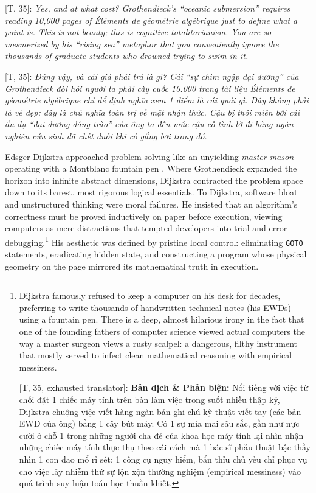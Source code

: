 \documentclass[11pt]{article}
\begin{document}
\vspace{2mm}
\textsf{[T, 35]:} \textit{Yes, and at what cost? Grothendieck's ``oceanic submersion'' requires reading 10,000 pages of Éléments de géométrie algébrique just to define what a point is. This is not beauty; this is cognitive totalitarianism. You are so mesmerized by his ``rising sea'' metaphor that you conveniently ignore the thousands of graduate students who drowned trying to swim in it.}

\textsf{[T, 35]:} \textit{Đúng vậy, và cái giá phải trả là gì? Cái ``sự chìm ngập đại dương'' của Grothendieck đòi hỏi người ta phải cày cuốc 10.000 trang tài liệu Éléments de géométrie algébrique chỉ để định nghĩa xem 1 điểm là cái quái gì. Đây không phải là vẻ đẹp; đây là chủ nghĩa toàn trị về mặt nhận thức. Cậu bị thôi miên bởi cái ẩn dụ ``đại dương dâng trào'' của ông ta đến mức cậu cố tình lờ đi hàng ngàn nghiên cứu sinh đã chết đuối khi cố gắng bơi trong đó.}
\vspace{2mm}

Edsger Dijkstra approached problem-solving like an unyielding \emph{master mason} operating with a Montblanc fountain pen \cite{dijkstra1976discipline}. Where Grothendieck expanded the horizon into infinite abstract dimensions, Dijkstra contracted the problem space down to its barest, most rigorous logical essentials. To Dijkstra, software bloat and unstructured thinking were moral failures. He insisted that an algorithm's correctness must be proved inductively on paper before execution, viewing computers as mere distractions that tempted developers into trial-and-error debugging.\footnote{Dijkstra famously refused to keep a computer on his desk for decades, preferring to write thousands of handwritten technical notes (his EWDs) using a fountain pen. There is a deep, almost hilarious irony in the fact that one of the founding fathers of computer science viewed actual computers the way a master surgeon views a rusty scalpel: a dangerous, filthy instrument that mostly served to infect clean mathematical reasoning with empirical messiness.
	
	\textsf{[T, 35, exhausted translator]:} \textbf{Bản dịch \& Phản biện:} Nổi tiếng với việc từ chối đặt 1 chiếc máy tính trên bàn làm việc trong suốt nhiều thập kỷ, Dijkstra chuộng việc viết hàng ngàn bản ghi chú kỹ thuật viết tay (các bản EWD của ông) bằng 1 cây bút máy. Có 1 sự mỉa mai sâu sắc, gần như nực cười ở chỗ 1 trong những người cha đẻ của khoa học máy tính lại nhìn nhận những chiếc máy tính thực thụ theo cái cách mà 1 bác sĩ phẫu thuật bậc thầy nhìn 1 con dao mổ rỉ sét: 1 công cụ nguy hiểm, bẩn thỉu chủ yếu chỉ phục vụ cho việc lây nhiễm thứ sự lộn xộn thường nghiệm (empirical messiness) vào quá trình suy luận toán học thuần khiết.} His aesthetic was defined by pristine local control: eliminating \texttt{GOTO} statements, eradicating hidden state, and constructing a program whose physical geometry on the page mirrored its mathematical truth in execution.
\end{document}

